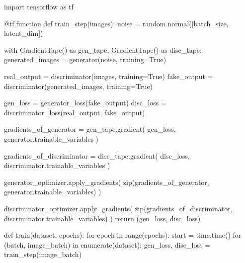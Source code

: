 \begin{python}
import tensorflow as tf

@tf.function
def train_step(images):
    noise = random.normal([batch_size, latent_dim])

    with GradientTape() as gen_tape, GradientTape() as disc_tape:
        generated_images = generator(noise, training=True)

        real_output = discriminator(images, training=True)
        fake_output = discriminator(generated_images, training=True)

        gen_loss = generator_loss(fake_output)
        disc_loss = discriminator_loss(real_output, fake_output)

    gradients_of_generator = gen_tape.gradient(
        gen_loss,
        generator.trainable_variables
    )

    gradients_of_discriminator = disc_tape.gradient(
        disc_loss,
        discriminator.trainable_variables
    )

    generator_optimizer.apply_gradients(
        zip(gradients_of_generator,
            generator.trainable_variables)
    )

    discriminator_optimizer.apply_gradients(
        zip(gradients_of_discriminator,
            discriminator.trainable_variables)
    )
    return (gen_loss, disc_loss)
\end{python}


\begin{python}
def train(dataset, epochs):
    for epoch in range(epochs):
        start = time.time()
        for (batch, image_batch) in enumerate(dataset):
            gen_loss, disc_loss = train_step(image_batch)
\end{python}



